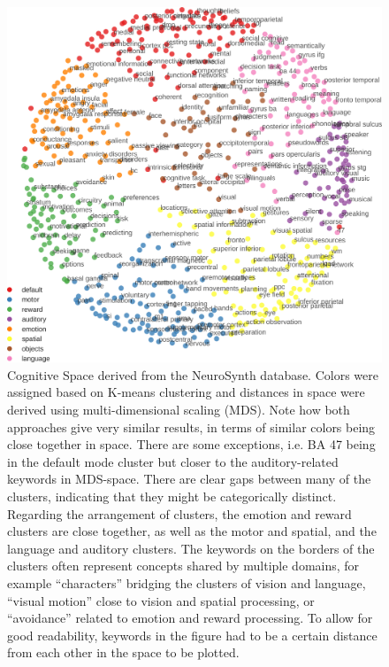 \documentclass[fleqn,10pt]{SelfArx} %
\begin{document}
\begin{figure}[htbp]
	\begin{minipage}{\textwidth}
		\renewcommand{\familydefault}{\sfdefault}\normalfont
		\centering
		\includegraphics[width=\columnwidth]{./figs/fig1_nsBallSparse.png}
				\vspace*{-3mm}
		\caption{Cognitive Space derived from the NeuroSynth database. Colors were assigned based on K-means clustering and distances in space were derived using multi-dimensional scaling (MDS). Note how both approaches give very similar results, in terms of similar colors being close together in space. There are some exceptions, i.e. BA 47 being in the default mode cluster but closer to the auditory-related keywords in MDS-space. There are clear gaps between many of the clusters, indicating that they might be categorically distinct. Regarding the arrangement of clusters, the emotion and reward clusters are close together, as well as the motor and spatial, and the language and auditory clusters. The keywords on the borders of the clusters often represent concepts shared by multiple domains, for example “characters” bridging the clusters of vision and language, “visual motion” close to vision and spatial processing, or “avoidance” related to emotion and reward processing. To allow for good readability, keywords in the figure had to be a certain distance from each other in the space to be plotted.}%
		\label{fig:nsBall}
	\end{minipage}
\end{figure}
\end{document}
